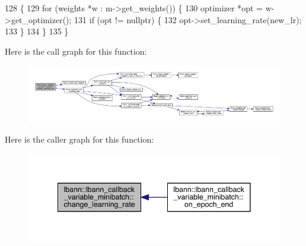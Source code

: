 \begin{DoxyCode}
128                                 \{
129   \textcolor{keywordflow}{for} (weights *w : m->get\_weights()) \{
130     optimizer *opt = w->get\_optimizer();
131     \textcolor{keywordflow}{if} (opt != \textcolor{keyword}{nullptr}) \{
132       opt->set\_learning\_rate(new\_lr);
133     \}
134   \}
135 \}
\end{DoxyCode}
Here is the call graph for this function\+:\nopagebreak
\begin{figure}[H]
\begin{center}
\leavevmode
\includegraphics[width=350pt]{classlbann_1_1lbann__callback__variable__minibatch_af078f30f9c206b89bdd542ce1fc6d2ad_cgraph}
\end{center}
\end{figure}
Here is the caller graph for this function\+:\nopagebreak
\begin{figure}[H]
\begin{center}
\leavevmode
\includegraphics[width=341pt]{classlbann_1_1lbann__callback__variable__minibatch_af078f30f9c206b89bdd542ce1fc6d2ad_icgraph}
\end{center}
\end{figure}
\mbox{\label{classlbann_1_1lbann__callback__variable__minibatch_a9de892c44231eadbbc7d27cfcc340ce2}} 
